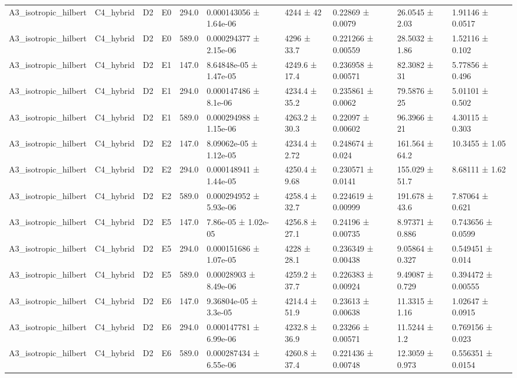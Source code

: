 \begin{table}
\begin{tabular}{llllllllll}
A3\_isotropic\_hilbert & C4\_hybrid & D2 & E0 & 294.0 & 0.000143056 ± 1.64e-06 & 4244 ± 42 & 0.22869 ± 0.0079 & 26.0545 ± 2.03 & 1.91146 ± 0.0517 \\
A3\_isotropic\_hilbert & C4\_hybrid & D2 & E0 & 589.0 & 0.000294377 ± 2.15e-06 & 4296 ± 33.7 & 0.221266 ± 0.00559 & 28.5032 ± 1.86 & 1.52116 ± 0.102 \\
A3\_isotropic\_hilbert & C4\_hybrid & D2 & E1 & 147.0 & 8.64848e-05 ± 1.47e-05 & 4249.6 ± 17.4 & 0.236958 ± 0.00571 & 82.3082 ± 31 & 5.77856 ± 0.496 \\
A3\_isotropic\_hilbert & C4\_hybrid & D2 & E1 & 294.0 & 0.000147486 ± 8.1e-06 & 4234.4 ± 35.2 & 0.235861 ± 0.0062 & 79.5876 ± 25 & 5.01101 ± 0.502 \\
A3\_isotropic\_hilbert & C4\_hybrid & D2 & E1 & 589.0 & 0.000294988 ± 1.15e-06 & 4263.2 ± 30.3 & 0.22097 ± 0.00602 & 96.3966 ± 21 & 4.30115 ± 0.303 \\
A3\_isotropic\_hilbert & C4\_hybrid & D2 & E2 & 147.0 & 8.09062e-05 ± 1.12e-05 & 4234.4 ± 2.72 & 0.248674 ± 0.024 & 161.564 ± 64.2 & 10.3455 ± 1.05 \\
A3\_isotropic\_hilbert & C4\_hybrid & D2 & E2 & 294.0 & 0.000148941 ± 1.44e-05 & 4250.4 ± 9.68 & 0.230571 ± 0.0141 & 155.029 ± 51.7 & 8.68111 ± 1.62 \\
A3\_isotropic\_hilbert & C4\_hybrid & D2 & E2 & 589.0 & 0.000294952 ± 5.93e-06 & 4258.4 ± 32.7 & 0.224619 ± 0.00999 & 191.678 ± 43.6 & 7.87064 ± 0.621 \\
A3\_isotropic\_hilbert & C4\_hybrid & D2 & E5 & 147.0 & 7.86e-05 ± 1.02e-05 & 4256.8 ± 27.1 & 0.24196 ± 0.00735 & 8.97371 ± 0.886 & 0.743656 ± 0.0599 \\
A3\_isotropic\_hilbert & C4\_hybrid & D2 & E5 & 294.0 & 0.000151686 ± 1.07e-05 & 4228 ± 28.1 & 0.236349 ± 0.00438 & 9.05864 ± 0.327 & 0.549451 ± 0.014 \\
A3\_isotropic\_hilbert & C4\_hybrid & D2 & E5 & 589.0 & 0.00028903 ± 8.49e-06 & 4259.2 ± 37.7 & 0.226383 ± 0.00924 & 9.49087 ± 0.729 & 0.394472 ± 0.00555 \\
A3\_isotropic\_hilbert & C4\_hybrid & D2 & E6 & 147.0 & 9.36804e-05 ± 3.3e-05 & 4214.4 ± 51.9 & 0.23613 ± 0.00638 & 11.3315 ± 1.16 & 1.02647 ± 0.0915 \\
A3\_isotropic\_hilbert & C4\_hybrid & D2 & E6 & 294.0 & 0.000147781 ± 6.99e-06 & 4232.8 ± 36.9 & 0.23266 ± 0.00571 & 11.5244 ± 1.2 & 0.769156 ± 0.023 \\
A3\_isotropic\_hilbert & C4\_hybrid & D2 & E6 & 589.0 & 0.000287434 ± 6.55e-06 & 4260.8 ± 37.4 & 0.221436 ± 0.00748 & 12.3059 ± 0.973 & 0.556351 ± 0.0154 \\

\end{tabular}
\end{table}
